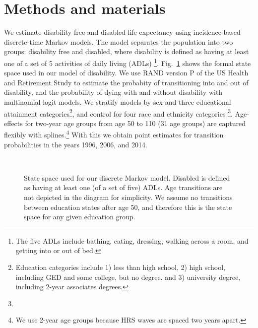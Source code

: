 \section{Methods and materials}
\label{sec:methods}
We estimate disability free and disabled life expectancy using incidence-based discrete-time Markov models. The model separates the population into two groups: disability free and disabled, where disability is defined as having at least one of a set of 5 activities of daily living (ADLs) \footnote{The five ADLs include bathing, eating, dressing, walking across a room, and getting into or out of bed.}. Fig.~\ref{fig:statespace} shows the formal state space used in our model of disability. We use RAND version P of the US Health and Retirement Study \citep{RAND, HRS} to estimate the probabity of transitioning into and out of disability, and the probability of dying with and without disability with multinomial logit models. We stratify models by sex and three educational attainment categories\footnote{Education categories include 1) less than high school, 2) high school, including GED and some college, but no degree, and 3) university degree, including 2-year associates degrees.}, and control for four race and ethnicity categories \footnote{}. Age-effects for two-year age groups from age 50 to 110 (31 age groups) are captured flexibly with splines.\footnote{We use 2-year age groups because HRS waves are spaced two years apart.} With this we obtain point estimates for transition probabilities in the years 1996, 2006, and 2014. 

\begin{figure}[ht!]\centering
{}\\

\caption{State space used for our discrete Markov model. Disabled is defined as having at least one (of a set of five) ADLs. Age transitions are not depicted in the diagram for simplicity. We assume no transitions between education states after age 50, and therefore this is the state space for any given education group.}\label{fig:statespace}
\end{figure}

